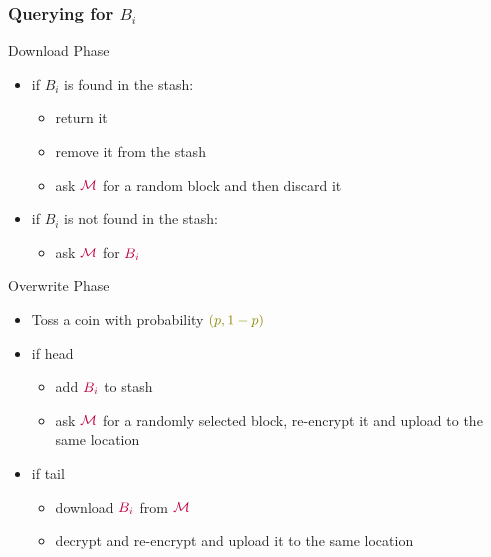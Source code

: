 \documentclass[]{beamer}
\newcommand{\manager}{\mathcal{M}}
\begin{document}
\begin{frame}
\frametitle{Querying for $B_i$}
\begin{block}{Download Phase}
\begin{itemize}[<+->]
\item {\color{blue} if $B_i$ is found in the stash:}
    \begin{itemize}
        \item return it 
        \item remove it from the stash
        \item ask $\color{purple} \manager$ for a random block and then discard it
    \end{itemize}
\item{\color{blue} if $B_i$ is not found in the stash:}
    \begin{itemize}
        \item ask $\color{purple} \manager$ for $\color{purple} B_i$
    \end{itemize}
\end{itemize}
\end{block}
\begin{block}{Overwrite Phase}
\begin{itemize}[<+->]
\item Toss a coin with probability $\color{olive} (p,1-p)$
\item if head
    \begin{itemize}
        \item add $\color{purple} B_i$ to stash
        \item ask $\color{purple} \manager$ for a randomly selected block, 
        re-encrypt it and upload to the same location
    \end{itemize}
\item if tail
    \begin{itemize}
        \item download $\color{purple} B_i$ from $\color{purple} \manager$
        \item decrypt and re-encrypt and upload it to the same location
    \end{itemize}
\end{itemize}
\end{block}
\end{frame}
\end{document}
